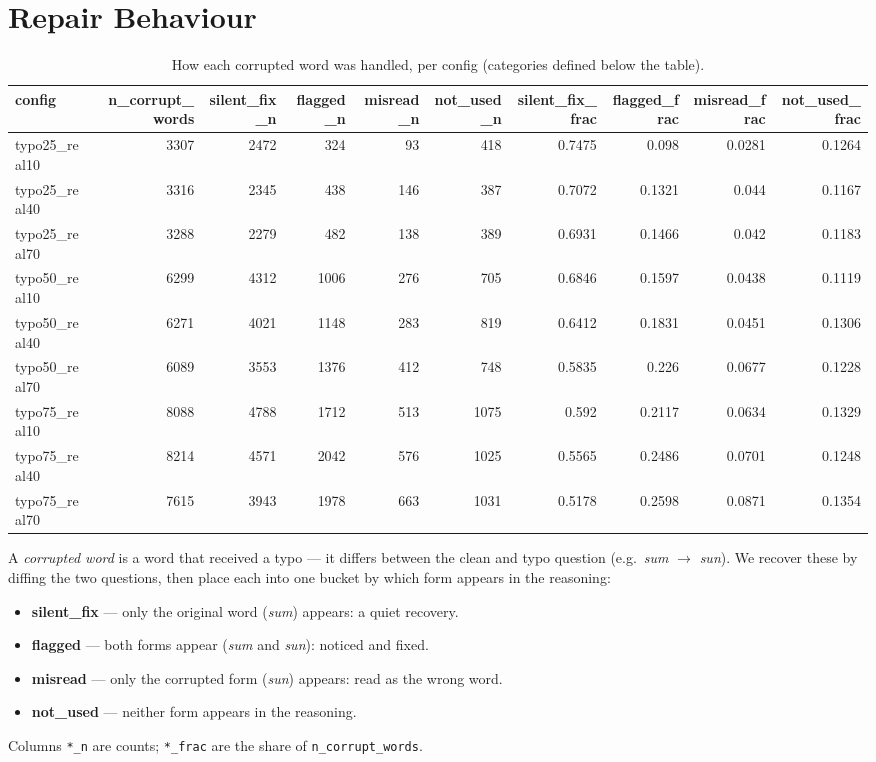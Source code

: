 \documentclass[11pt]{article}
\begin{document}
\section*{Repair Behaviour}
\begin{table}[H]
\centering
\caption{How each corrupted word was handled, per config (categories defined below the table).}
\small
\begin{adjustbox}{max width=\textwidth}
\begin{tabular}{lrrrrrrrrr}
\toprule
\textbf{config} & \textbf{n\_corrupt\_words} & \textbf{silent\_fix\_n} & \textbf{flagged\_n} & \textbf{misread\_n} & \textbf{not\_used\_n} & \textbf{silent\_fix\_frac} & \textbf{flagged\_frac} & \textbf{misread\_frac} & \textbf{not\_used\_frac} \\
\midrule
typo25\_real10 & 3307 & 2472 & 324 & 93 & 418 & 0.7475 & 0.098 & 0.0281 & 0.1264 \\
typo25\_real40 & 3316 & 2345 & 438 & 146 & 387 & 0.7072 & 0.1321 & 0.044 & 0.1167 \\
typo25\_real70 & 3288 & 2279 & 482 & 138 & 389 & 0.6931 & 0.1466 & 0.042 & 0.1183 \\
typo50\_real10 & 6299 & 4312 & 1006 & 276 & 705 & 0.6846 & 0.1597 & 0.0438 & 0.1119 \\
typo50\_real40 & 6271 & 4021 & 1148 & 283 & 819 & 0.6412 & 0.1831 & 0.0451 & 0.1306 \\
typo50\_real70 & 6089 & 3553 & 1376 & 412 & 748 & 0.5835 & 0.226 & 0.0677 & 0.1228 \\
typo75\_real10 & 8088 & 4788 & 1712 & 513 & 1075 & 0.592 & 0.2117 & 0.0634 & 0.1329 \\
typo75\_real40 & 8214 & 4571 & 2042 & 576 & 1025 & 0.5565 & 0.2486 & 0.0701 & 0.1248 \\
typo75\_real70 & 7615 & 3943 & 1978 & 663 & 1031 & 0.5178 & 0.2598 & 0.0871 & 0.1354 \\
\bottomrule
\end{tabular}
\end{adjustbox}
\end{table}

\noindent A \emph{corrupted word} is a word that received a
typo --- it differs between the clean and typo question (e.g.\ \emph{sum} $\to$
\emph{sun}). We recover these by diffing the two questions, then place each into one
bucket by which form appears in the reasoning:
\begin{itemize}\setlength{\itemsep}{1pt}
  \item \textbf{silent\_fix} --- only the original word (\emph{sum}) appears: a quiet recovery.
  \item \textbf{flagged} --- both forms appear (\emph{sum} and \emph{sun}): noticed and fixed.
  \item \textbf{misread} --- only the corrupted form (\emph{sun}) appears: read as the wrong word.
  \item \textbf{not\_used} --- neither form appears in the reasoning.
\end{itemize}
\noindent Columns \texttt{*\_n} are counts; \texttt{*\_frac} are the share of
\texttt{n\_corrupt\_words}.
\medskip
\end{document}
